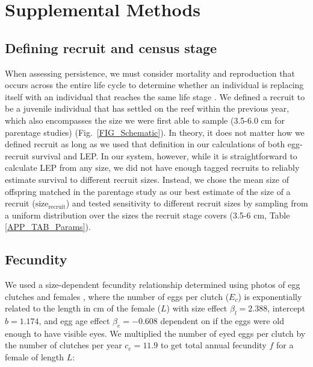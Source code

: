 \documentclass[12pt, oneside]{article}   	%
\begin{document}
\section{Supplemental Methods} \label{APP_SUPP_METHODS}

\subsection{Defining recruit and census stage} \label{APP_SEC_METHODS_Recruit_def}

When assessing persistence, we must consider mortality and reproduction that occurs across the entire life cycle to determine whether an individual is replacing itself with an individual that reaches the same life stage \citep{burgess2014beyond}. We defined a recruit to be a juvenile individual that has settled on the reef within the previous year, which also encompasses the size we were first able to sample (3.5-6.0 cm for parentage studies) (Fig.\ \ref{FIG_Schematic}). In theory, it does not matter how we defined recruit as long as we used that definition in our calculations of both egg-recruit survival and LEP. In our system, however, while it is straightforward to calculate LEP from any size, we did not have enough tagged recruits to reliably estimate survival to different recruit sizes. Instead, we chose the mean size of offspring matched in the parentage study as our best estimate of the size of a recruit ($\text{size}_\text{recruit}$) and tested sensitivity to different recruit sizes by sampling from a uniform distribution over the sizes the recruit stage covers (3.5-6 cm, Table \ref{APP_TAB_Params}).

\subsection{Fecundity} \label{APP_SEC_METHODS_Fecundity}

We used a size-dependent fecundity relationship determined using photos of egg clutches and females \citep{yawdoszynInPrepfecundity}, where the number of eggs per clutch ($E_c$) is exponentially related to the length in cm of the female ($L$) with size effect $\beta_l = 2.388$, intercept $b = 1.174$, and egg age effect $\beta_e = -0.608$ dependent on if the eggs were old enough to have visible eyes. We multiplied the number of eyed eggs per clutch by the number of clutches per year $c_e = 11.9$ \citep[estimate from][]{holtswarth2017fecundity} to get total annual fecundity $f$ for a female of length $L$:
\end{document}
